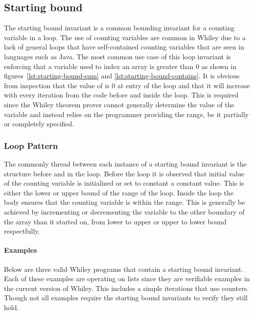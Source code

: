 
\subsection{Starting bound}

The starting bound invariant is a common bounding invariant for a counting
variable in a loop.
The use of counting variables are common in Whiley due to a lack of 
general  loops that have self-contained counting variables
that are seen in languages such as Java.
The most common use case of this loop invariant is enforcing that 
a variable used to index an array is greater than 0 as shown in
figures~\ref{lst:starting-bound-sum} and \ref{lst:starting-bound-contains}.
It is obvious from inspection that the value of  is 0 at entry
of the loop and that it will increase with every iteration from the code before
and inside the loop.
This is required since the Whiley theorem prover cannot generally 
determine the value of the variable and instead relies on the programmer
providing the range, be it partially or completely specified.

\subsubsection{Loop Pattern}

The commonly thread between each instance of a starting bound invariant
is the structure before and in the loop.
Before the loop it is observed that initial value of the counting
variable is initialized or set to constant a constant value.
This is either the lower or upper bound of the range of the loop.
Inside the loop the body ensures that the counting variable is within
the range.
This is generally be achieved by incrementing or decrementing the variable
to the other boundary of the array than it started on, from lower to upper or
upper to lower bound respectfully.

\paragraph{Examples}

Below are three valid Whiley programs that contain a starting bound
invariant.
Each of these examples are operating on lists since they are verifiable
examples in the current version of Whiley.
This includes a simple iterations that use counters. Though not all
examples require the starting bound invariants to verify they still hold.



